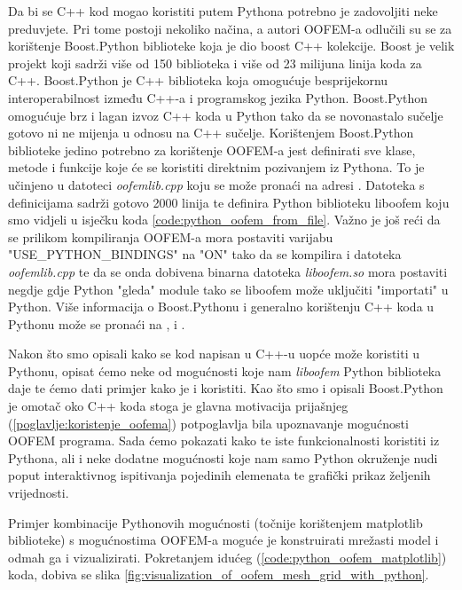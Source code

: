 \documentclass[a4paper,twoside,12pt]{memoir} %
\begin{document}
Da bi se C++ kod mogao koristiti putem Pythona potrebno je zadovoljiti neke preduvjete. Pri tome postoji nekoliko načina, a autori OOFEM-a odlučili su se za korištenje Boost.Python biblioteke koja je dio boost C++ kolekcije. Boost je velik projekt koji sadrži više od 150 biblioteka i više od 23 milijuna linija koda za C++. Boost.Python je C++ biblioteka koja omogućuje besprijekornu interoperabilnost između C++-a i programskog jezika Python. Boost.Python omogućuje brz i lagan izvoz C++ koda u Python tako da se novonastalo sučelje gotovo ni ne mijenja u odnosu na C++ sučelje. Korištenjem Boost.Python biblioteke jedino potrebno za korištenje OOFEM-a jest definirati sve klase, metode i funkcije koje će se koristiti direktnim pozivanjem iz Pythona. To je učinjeno u datoteci \textit{oofemlib.cpp} koju se može pronaći na adresi \cite{oofemlib_source}. Datoteka s definicijama sadrži gotovo 2000 linija te definira Python biblioteku liboofem koju smo vidjeli u isječku koda \ref{code:python_oofem_from_file}. Važno je još reći da se prilikom kompiliranja OOFEM-a mora postaviti varijabu "USE\_PYTHON\_BINDINGS" na "ON" tako da se kompilira i datoteka \textit{oofemlib.cpp} te da se onda dobivena binarna datoteka \textit{liboofem.so} mora postaviti negdje gdje Python "gleda" module tako se liboofem može uključiti "importati" u Python. Više informacija o Boost.Pythonu i generalno korištenju C++ koda u Pythonu može se pronaći na \cite{boost_python}, \cite{ctypes} i \cite{swig}. \par

Nakon što smo opisali kako se kod napisan u C++-u uopće može koristiti u Pythonu, opisat ćemo neke od mogućnosti koje nam \textit{liboofem} Python biblioteka daje te ćemo dati primjer kako je i koristiti. Kao što smo i opisali Boost.Python je omotač oko C++ koda stoga je glavna motivacija prijašnjeg (\ref{poglavlje:koristenje_oofema}) potpoglavlja bila upoznavanje mogućnosti OOFEM programa. Sada ćemo pokazati kako te iste funkcionalnosti koristiti iz Pythona, ali i neke dodatne mogućnosti koje nam samo Python okruženje nudi poput interaktivnog ispitivanja pojedinih elemenata te grafički prikaz željenih vrijednosti. \par

Primjer kombinacije Pythonovih mogućnosti (točnije korištenjem matplotlib biblioteke) s mogućnostima OOFEM-a moguće je konstruirati mrežasti model i odmah ga i vizualizirati. Pokretanjem idućeg (\ref{code:python_oofem_matplotlib}) koda, dobiva se slika \ref{fig:visualization_of_oofem_mesh_grid_with_python}.
\end{document}
